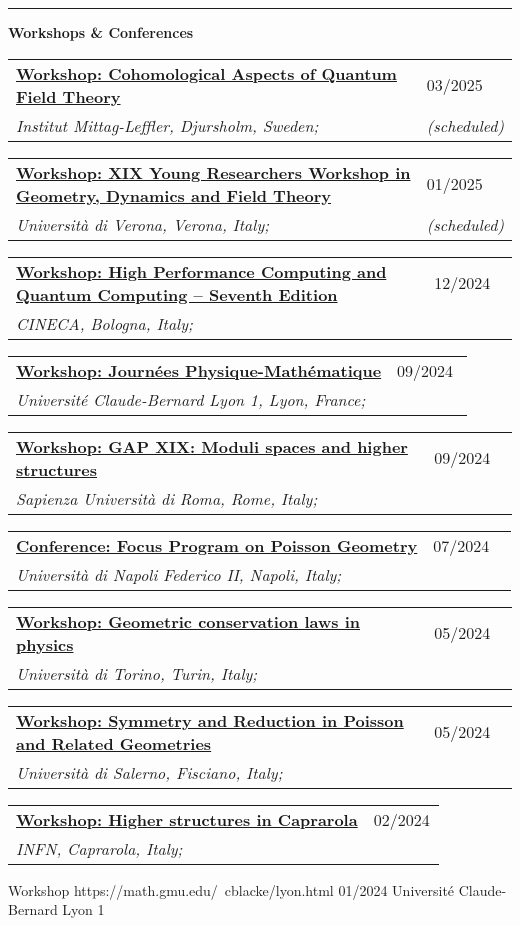 \documentclass[a4paper]{article}
\newcommand{\block}[1]{\hrule \vspace{0.2cm} \textbf{\Large #1} \vspace{0.2cm}}
\newcommand{\longvoice}[8]{
	\begin{tabular}{p{0.83\linewidth} p{0.17\linewidth} }
		\textbf{\href{#3}{#2: #1}} & #4 
		\\ 
		\textit{#5, #6, #7;} & {\small\emph{#8}}
	\end{tabular}
	\vspace{.5em}
}
\begin{document}

	\block{Workshops \& Conferences}

	\longvoice{Cohomological Aspects of Quantum Field Theory}
		{Workshop}
		{https://www.mittag-leffler.se/activities/cohomological-aspects-of-quantum-field-theory/}
		{03/2025}
		{Institut Mittag-Leffler}
		{Djursholm}
		{Sweden}
		{(scheduled)}
	\longvoice{XIX Young Researchers Workshop in Geometry, Dynamics and Field Theory}
		{Workshop}
		{https://sites.google.com/view/xix-yrw-verona/program?authuser=0}
		{01/2025}
		{Università di Verona}
		{Verona}
		{Italy}
		{(scheduled)}
	\longvoice{High Performance Computing and Quantum Computing – Seventh Edition}
		{Workshop}
		{https://eventi.cineca.it/en/hpc/high-performance-computing-and-quantum-computing-seventh-edition/bologna-20241212}
		{12/2024}
		{CINECA}
		{Bologna}
		{Italy}
		{}
	\longvoice{Journées Physique-Mathématique}
		{Workshop}
		{https://indico.math.cnrs.fr/event/12743/overview}
		{09/2024}
		{Université Claude-Bernard Lyon 1}
		{Lyon}
		{France}
		{}
	\longvoice{GAP XIX: Moduli spaces and higher structures}
		{Workshop}
		{https://www1.mat.uniroma1.it/~fiorenza/GAP-Rome/GAP-XIX-2024-Rome.html}
		{09/2024}
		{Sapienza Università di Roma}
		{Rome}
		{Italy}
		{}
	\longvoice{Focus Program on Poisson Geometry}
		{Conference}
		{https://sites.google.com/view/poisson2024/poisson-2024?authuser=0}
		{07/2024}
		{Università di Napoli Federico II}
		{Napoli}
		{Italy}
		{}
	\longvoice{Geometric conservation laws in physics}
		{Workshop}
		{https://www.dropbox.com/scl/fi/j54tl4m10fl2scbrtc4sx/2405-Torino-Conservationlaws.pdf?rlkey=ay7nrxda4fg8lklvox578g6yj\&st=9t3jx47r\&dl=0}
		{05/2024}
		{Università di Torino}
		{Turin}
		{Italy}
		{}
	\longvoice{Symmetry and Reduction in Poisson and Related Geometries}
		{Workshop}
		{https://sites.google.com/view/poisson2024/seminars-workshops/symmetry-reduction?authuser=0}
		{05/2024}
		{Università di Salerno}
		{Fisciano}
		{Italy}
		{}
	\longvoice{Higher structures in Caprarola}
		{Workshop}
		{http://wpage.unina.it/francesco.dandrea/Caprarola2024/index.html}
		{02/2024}
		{INFN}
		{Caprarola}
		{Italy}
		{}
		{Workshop}
		{https://math.gmu.edu/~cblacke/lyon.html}
		{01/2024}
		{Université Claude-Bernard Lyon 1}
\end{document}
